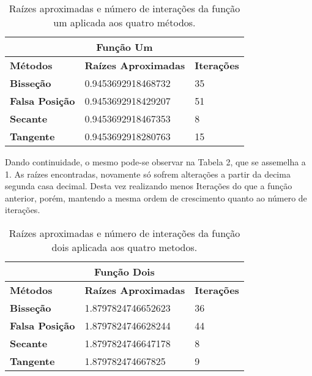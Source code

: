 \documentclass[12pt]{article}
\begin{document}
\begin{table}[!h]
\begin{center}
\begin{tabular}{lll}
\multicolumn{3}{c}{\textbf{Função Um}}                                                                              \\ \hline
\multicolumn{1}{l|}{\textbf{Métodos}}       & \multicolumn{1}{l|}{\textbf{Raízes Aproximadas}} & \textbf{Iterações} \\ \hline
\multicolumn{1}{l|}{\textbf{Bisseção}}      & \multicolumn{1}{l|}{0.9453692918468732}          & 35                 \\ \hline
\multicolumn{1}{l|}{\textbf{Falsa Posição}} & \multicolumn{1}{l|}{0.9453692918429207}          & 51                 \\ \hline
\multicolumn{1}{l|}{\textbf{Secante}}       & \multicolumn{1}{l|}{0.9453692918467353}          & 8                  \\ \hline
\multicolumn{1}{l|}{\textbf{Tangente}}      & \multicolumn{1}{l|}{0.9453692918280763}          & 15                
\end{tabular}
    \caption{Raízes aproximadas e número de interações da função um aplicada aos quatro métodos.}
\end{center}
\end{table}

Dando continuidade, o mesmo pode-se observar na Tabela 2, que se assemelha a 1. As raízes encontradas, novamente só sofrem alterações a partir da decima segunda casa decimal. Desta vez realizando menos Iterações do que a função anterior, porém, mantendo a mesma ordem de crescimento quanto ao número de iterações.

\begin{table}[!h]
\begin{center}
\begin{tabular}{lll}
\multicolumn{3}{c}{\textbf{Função Dois}}                                                                            \\ \hline
\multicolumn{1}{l|}{\textbf{Métodos}}       & \multicolumn{1}{l|}{\textbf{Raízes Aproximadas}} & \textbf{Iterações} \\ \hline
\multicolumn{1}{l|}{\textbf{Bisseção}}      & \multicolumn{1}{l|}{1.8797824746652623}          & 36                 \\ \hline
\multicolumn{1}{l|}{\textbf{Falsa Posição}} & \multicolumn{1}{l|}{1.8797824746628244}          & 44                 \\ \hline
\multicolumn{1}{l|}{\textbf{Secante}}       & \multicolumn{1}{l|}{1.8797824746647178}          & 8                  \\ \hline
\multicolumn{1}{l|}{\textbf{Tangente}}      & \multicolumn{1}{l|}{1.879782474667825}           & 9
\end{tabular}
\end{center}
    \caption{Raízes aproximadas e número de interações da função dois aplicada aos quatro metodos.}
\end{table}
\end{document}
